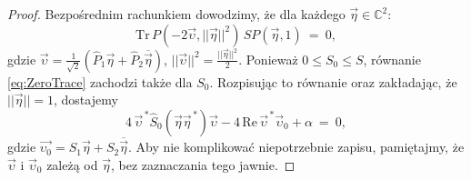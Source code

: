 {\begin{proof}
Bezpośrednim rachunkiem dowodzimy, że dla każdego
$\vec{\eta} \in \mathbb{C}^{2}$:
\begin{equation}
 \label{eq:ZeroTrace}
 \text{Tr} \, P(-2\vec{\upsilon}, ||\vec{\eta}||^{2}) \, S P(\vec{\eta},1)
     \:=\: 0,
\end{equation}
gdzie $\vec{\upsilon} =
 \frac{1}{\sqrt{2}} \left(
  \hat{P}_{1} \vec{\eta} + \hat{P}_{2} \overline{\vec{\eta}}
 \right)$,
$||\vec{\upsilon}||^{2} = \tfrac{||\vec{\eta}||^{2}}{2}$.
Ponieważ $0 \leq S_{0} \leq S$, równanie
\eqref{eq:ZeroTrace} zachodzi także dla $S_{0}$.
Rozpisując to równanie oraz zakładając, że $||\vec{\eta}|| = 1$,
dostajemy
\begin{equation}
 \label{eq:ZeroTraceExplicit}
 4 \, \vec{\upsilon}^{\,*} \hat{S}_{0}(\vec{\eta} \vec{\eta}^{\,*}) \vec{\upsilon} -
 4 \, \text{Re} \, \vec{\upsilon}^{\,*} \vec{\upsilon}_{0} + \alpha \: = \: 0,
\end{equation}
gdzie $\vec{\upsilon_{0}} = S_{1} \vec{\eta} + S_{2} \overline{\vec{\eta}}$.
Aby nie komplikować niepotrzebnie zapisu,
pamiętajmy, że $\vec{\upsilon}$ i $\vec{\upsilon}_{0}$ zależą od $\vec{\eta}$,
bez zaznaczania tego jawnie.


\end{proof}}
